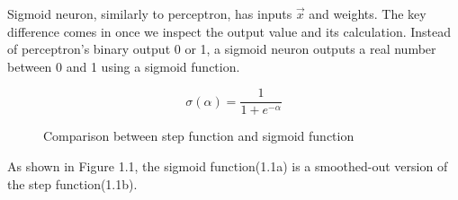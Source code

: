 Sigmoid neuron, similarly to perceptron, has inputs $\vec{x}$ and weights. The key difference comes in once we inspect the output value and its calculation. Instead of perceptron's binary output 0 or 1, a sigmoid neuron outputs a real number between 0 and 1 using a sigmoid function.\cite{nndl2015michaelnielsen}\cite{rojas2013neural}

\begin{equation}
    {\sigma(\alpha) = \frac{1}{1 + e^{-\alpha}}}
\end{equation}

\begin{figure}[h]
	\centering
    \qquad
    \caption{Comparison between step function and sigmoid function}
\end{figure}
As shown in Figure 1.1, the sigmoid function(1.1a) is a smoothed-out version of the step function(1.1b).
